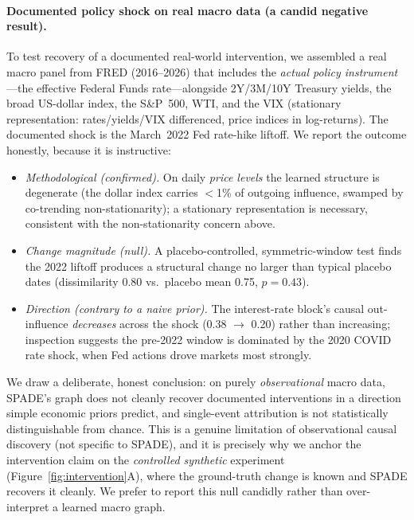\paragraph{Documented policy shock on real macro data (a candid negative result).}
To test recovery of a documented real-world intervention, we assembled a real
macro panel from FRED (2016--2026) that includes the \emph{actual policy
instrument}---the effective Federal Funds rate---alongside 2Y/3M/10Y Treasury
yields, the broad US-dollar index, the S\&P~500, WTI, and the VIX (stationary
representation: rates/yields/VIX differenced, price indices in log-returns). The
documented shock is the March~2022 Fed rate-hike liftoff. We report the outcome
honestly, because it is instructive:
\begin{itemize}
    \item \emph{Methodological (confirmed).} On daily \emph{price levels} the
    learned structure is degenerate (the dollar index carries $<$1\% of outgoing
    influence, swamped by co-trending non-stationarity); a stationary
    representation is necessary, consistent with the non-stationarity concern above.
    \item \emph{Change magnitude (null).} A placebo-controlled, symmetric-window
    test finds the 2022 liftoff produces a structural change no larger than
    typical placebo dates (dissimilarity 0.80 vs.\ placebo mean 0.75,
    $p{=}0.43$).
    \item \emph{Direction (contrary to a naive prior).} The interest-rate block's
    causal out-influence \emph{decreases} across the shock (0.38 $\to$ 0.20)
    rather than increasing; inspection suggests the pre-2022 window is dominated
    by the 2020 COVID rate shock, when Fed actions drove markets most strongly.
\end{itemize}
We draw a deliberate, honest conclusion: on purely \emph{observational} macro
data, SPADE's graph does not cleanly recover documented interventions in a
direction simple economic priors predict, and single-event attribution is not
statistically distinguishable from chance. This is a genuine limitation of
observational causal discovery (not specific to SPADE), and it is precisely why
we anchor the intervention claim on the \emph{controlled synthetic} experiment
(Figure~\ref{fig:intervention}A), where the ground-truth change is known and SPADE
recovers it cleanly. We prefer to report this null candidly rather than
over-interpret a learned macro graph.
